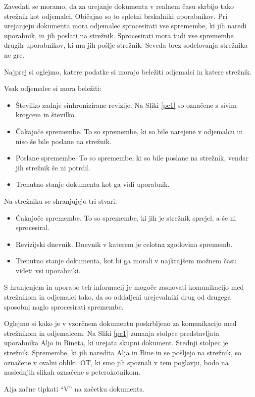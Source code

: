 \documentclass[a4paper, 12pt, twoside]{book}
\begin{document}
Zavedati se moramo, da za urejanje dokumenta v realnem času skrbijo tako strežnik kot odjemalci. Običajno so to spletni brskalniki uporabnikov. Pri urejanjeju dokumenta mora odjemalec sprocesirati vse spremembe, ki jih naredi uporabnik, in jih poslati na strežnik. Sprocesirati mora tudi vse spremembe drugih uporabnikov, ki mu jih pošlje strežnik. Seveda brez sodelovanja strežnika ne gre.

Najprej si oglejmo, katere podatke si morajo beležiti odjemalci in katere strežnik.

Vsak odjemalec si mora beležiti:
\begin{itemize}
	\item Številko zadnje sinhronizirane revizije. Na Sliki \ref{pc1} so označene s sivim krogcem in številko.
	\item Čakajoče spremembe. To so spremembe, ki so bile narejene v odjemalcu in niso še bile poslane na strežnik.
	\item Poslane spremembe. To so spremembe, ki so bile poslane na strežnik, vendar jih strežnik še ni potrdil.
	\item Trenutno stanje dokumenta kot ga vidi uporabnik.
\end{itemize}

Na strežniku se shranjujejo tri stvari:
\begin{itemize}
	\item Čakajoče spremembe. To so spremembe, ki jih je strežnik sprejel, a še ni sprocesiral.
	\item Revizijski dnevnik. Dnevnik v katerem je celotna zgodovina sprememb.
	\item Trenutno stanje dokumenta, kot bi ga morali v najkrajšem možnem času videti vsi uporabniki.
\end{itemize}

S hranjenjem in uporabo teh informacij je mogoče zasnovati komunikacijo med strežnikom in odjemalci tako, da so oddaljeni urejevalniki drug od drugega sposobni naglo sprocesirati spremembe.

Oglejmo si kako je v vzorčnem dokumentu poskrbljeno za komunikacijo med strežnikom in odjemalcem. Na Sliki \ref{pc1} zunanja stolpce predstavljata uporabnika Aljo in Bineta, ki urejata skupni dokument. Srednji stolpec je strežnik. Spremembe, ki jih naredita Alja in Bine in se pošljejo na strežnik, so označene v ovalni obliki. OT, ki smo jih spoznali v tem poglavju, bodo na naslednjih slikah označene s peterokotnikom.

Alja začne tipkati “V” na začetku dokumenta.
\end{document}
